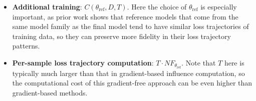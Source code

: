 \begin{itemize}
    \item \textbf{Additional training}: $C(\theta_{\text{ref}}, D, T)$. Here the choice of $\theta_{\text{ref}}$ is especially important, as prior work \cite{S2LRef} shows that reference models that come from the same model family as the final model tend to have similar loss trajectories of training data, so they can preserve more fidelity in their loss trajectory patterns.
    \item \textbf{Per-sample loss trajectory computation}: $T \cdot NF_{\theta_{\text{ref}}}$. Note that $T$ here is typically much larger than that in gradient-based influence computation, so the computational cost of this gradient-free approach can be even higher than gradient-based methods.
\end{itemize}
